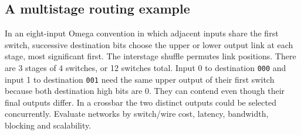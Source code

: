 \documentclass[12pt,a4paper]{article}
\begin{document}
\subsection{A multistage routing example}
In an eight-input Omega convention in which adjacent inputs share the first switch, successive destination bits choose the upper or lower output link at each stage, most significant first. The interstage shuffle permutes link positions. There are $3$ stages of $4$ switches, or 12 switches total. Input 0 to destination \texttt{000} and input 1 to destination \texttt{001} need the same upper output of their first switch because both destination high bits are 0. They can contend even though their final outputs differ. In a crossbar the two distinct outputs could be selected concurrently. Evaluate networks by switch/wire cost, latency, bandwidth, blocking and scalability.
\end{document}
